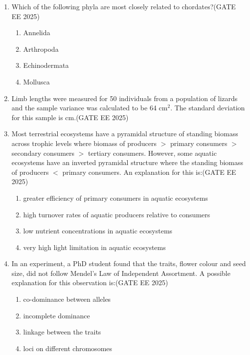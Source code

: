 \begin{enumerate}[leftmargin=*,label=\textbf{Q.\arabic*}]
\item Which of the following phyla are most closely related to chordates?\hfill {(GATE EE 2025)}
\begin{multicols}{2}
\begin{enumerate}
\item Annelida
\item Arthropoda
\item Echinodermata
\item Mollusca
\end{enumerate}
\end{multicols}

\item Limb lengths were measured for 50 individuals from a population of lizards and the sample variance was calculated to be 64 cm$^2$. The standard deviation for this sample is \underline{\hspace{2cm}} cm.\hfill {(GATE EE 2025)}
\item Most terrestrial ecosystems have a pyramidal structure of standing biomass across trophic levels where biomass of producers $>$ primary consumers $>$ secondary consumers $>$ tertiary consumers. However, some aquatic ecosystems have an inverted pyramidal structure where the standing biomass of producers $<$ primary consumers. An explanation for this is:\hfill {(GATE EE 2025)}
\begin{multicols}{2}
\begin{enumerate}
\item greater efficiency of primary consumers in aquatic ecosystems
\item high turnover rates of aquatic producers relative to consumers
\item low nutrient concentrations in aquatic ecosystems
\item very high light limitation in aquatic ecosystems
\end{enumerate}
\end{multicols}

\item In an experiment, a PhD student found that the traits, flower colour and seed size, did not follow Mendel’s Law of Independent Assortment. A possible explanation for this observation is:\hfill {(GATE EE 2025)}
\begin{multicols}{2}
\begin{enumerate}
\item co-dominance between alleles
\item incomplete dominance
\item linkage between the traits
\item loci on different chromosomes
\end{enumerate}
\end{multicols}


\end{enumerate}
